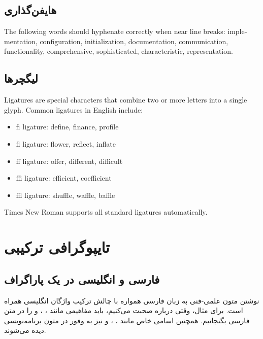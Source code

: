 \documentclass{matinbook}
\begin{document}
\section{هایفن‌گذاری}
\label{sec:typography-hyphenation}

\begin{latin}
The following words should hyphenate correctly when near line
breaks: implementation, configuration, initialization,
documentation, communication, functionality, comprehensive,
sophisticated, characteristic, representation.
\end{latin}

\section{لیگچرها}
\label{sec:typography-ligatures}

\begin{latin}
Ligatures are special characters that combine two or more
letters into a single glyph. Common ligatures in English
include:

\begin{itemize}
    \item fi ligature: define, finance, profile
    \item fl ligature: flower, reflect, inflate
    \item ff ligature: offer, different, difficult
    \item ffi ligature: efficient, coefficient
    \item ffl ligature: shuffle, waffle, baffle
\end{itemize}

Times New Roman supports all standard ligatures automatically.
\end{latin}

\chapter{تایپوگرافی ترکیبی}
\label{chap:typography-mixed}

\section{فارسی و انگلیسی در یک پاراگراف}
\label{sec:typography-mixed-paragraph}

نوشتن متون علمی-فنی به زبان فارسی همواره با چالش ترکیب
واژگان انگلیسی همراه است. برای مثال، وقتی درباره
 صحبت می‌کنیم، باید مفاهیمی مانند
، ، 
و  را در متن فارسی بگنجانیم.
همچنین اسامی خاص مانند ، ،
 و  نیز به وفور
در متون برنامه‌نویسی دیده می‌شوند.
\end{document}
